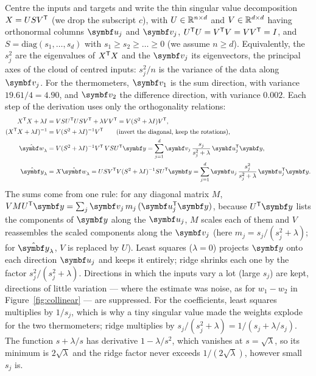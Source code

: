 \documentclass[11pt]{article}
\newcommand{\w}{\vect{w}}
\newcommand{\y}{\vect{y}}
\begin{document}
Centre the inputs and targets and write the thin singular value decomposition $X = U S V^{\mathsf{T}}$ (we drop the subscript $c$),
with $U \in \mathbb{R}^{n \times d}$ and $V \in \mathbb{R}^{d \times d}$ having orthonormal columns $\vect{u}_j$ and $\vect{v}_j$,
$U^{\mathsf{T}} U = V^{\mathsf{T}} V = VV^{\mathsf{T}} = I$, and $S = \mathrm{diag}(s_1, \dots, s_d)$ with $s_1 \ge s_2 \ge \dots \ge 0$ (we assume
$n \ge d$). Equivalently, the $s_j^2$ are the eigenvalues of $X^{\mathsf{T}} X$ and the $\vect{v}_j$ its eigenvectors, the principal
axes of the cloud of centred inputs: $s_j^2/n$ is the variance of the data along $\vect{v}_j$. For the thermometers,
$\vect{v}_1$ is the sum direction, with variance $19.61/4 = 4.90$, and $\vect{v}_2$ the difference direction, with
variance $0.002$. Each step of the derivation uses only the orthogonality relations:
\begin{align*}
  X\T X + \lambda I &= V S U\T U S V\T + \lambda VV\T = V(S^2 + \lambda I)V\T , \\
  (X\T X + \lambda I)^{-1} &= V(S^2 + \lambda I)^{-1}V\T \qquad \text{(invert the diagonal, keep the rotations)}, \\
  \hat{\w}_\lambda &= V(S^2 + \lambda I)^{-1}V\T\, V S U\T\y = \sum_{j=1}^d \vect{v}_j\, \frac{s_j}{s_j^2 + \lambda}\, \vect{u}_j\T\y , \\
  \hat{\y}_\lambda &= X\hat{\w}_\lambda = U S V\T V (S^2 + \lambda I)^{-1} S U\T\y = \sum_{j=1}^d \vect{u}_j\, \frac{s_j^2}{s_j^2 + \lambda}\, \vect{u}_j\T\y .
\end{align*}
The sums come from one rule: for any diagonal matrix $M$, $VMU\T\y = \sum_j \vect{v}_j\, m_j\,(\vect{u}_j\T\y)$, because
$U\T\y$ lists the components of $\y$ along the $\vect{u}_j$, $M$ scales each of them and $V$ reassembles the scaled
components along the $\vect{v}_j$ (here $m_j = s_j/(s_j^2 + \lambda)$; for $\hat{\y}_\lambda$, $V$ is replaced by $U$).
Least squares ($\lambda = 0$) projects $\y$ onto each direction $\vect{u}_j$ and keeps it entirely; ridge shrinks each one
by the factor $s_j^2/(s_j^2 + \lambda)$. Directions in which the inputs vary a lot (large $s_j$) are kept, directions of
little variation --- where the estimate was noise, as for $w_1 - w_2$ in Figure~\ref{fig:collinear} --- are suppressed.
For the coefficients, least squares multiplies by $1/s_j$, which is why a tiny singular value made the weights explode
for the two thermometers; ridge multiplies by $s_j/(s_j^2 + \lambda) = 1/(s_j + \lambda/s_j)$. The function
$s + \lambda/s$ has derivative $1 - \lambda/s^2$, which vanishes at $s = \sqrt{\lambda}$, so its minimum is $2\sqrt{\lambda}$
and the ridge factor never exceeds $1/(2\sqrt{\lambda})$, however small $s_j$ is.
\end{document}
